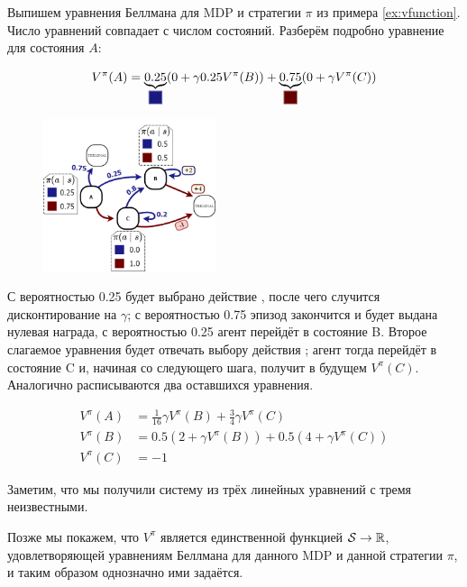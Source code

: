 \begin{example}
Выпишем уравнения Беллмана для MDP и стратегии $\pi$ из примера \ref{ex:vfunction}. Число уравнений совпадает с числом состояний. Разберём подробно уравнение для состояния $A$:

$$
V^{\pi}(A) = \underbrace{0.25}_{\colorsquare{ChadBlue}} (0 + \gamma 0.25 V^{\pi}(B)) + \underbrace{0.75}_{\colorsquare{ChadRed}} (0 + \gamma V^{\pi}(C) )
$$

\begin{figure}
\vspace{-0.8cm}
\centering
\includegraphics[width=0.45\textwidth]{Images/Value.png}
\vspace{-1cm}
\end{figure}

С вероятностью 0.25 будет выбрано действие , после чего случится дисконтирование на $\gamma$; с вероятностью 0.75 эпизод закончится и будет выдана нулевая награда, с вероятностью 0.25 агент перейдёт в состояние B. Второе слагаемое уравнения будет отвечать выбору действия ; агент тогда перейдёт в состояние C и, начиная со следующего шага, получит в будущем $V^{\pi}(C)$. Аналогично расписываются два оставшихся уравнения.

\vspace{-0.4cm}
\begin{align*}
V^{\pi}(A) &= \frac{1}{16} \gamma V^{\pi}(B) + \frac{3}{4} \gamma V^{\pi}(C) \\
V^{\pi}(B) &= 0.5 \left(2 + \gamma V^{\pi}(B) \right) + 0.5 \left( 4 + \gamma V^{\pi}(C) \right) \\
V^{\pi}(C) &= -1
\end{align*}

Заметим, что мы получили систему из трёх линейных уравнений с тремя неизвестными.
\end{example}

Позже мы покажем, что $V^\pi$ является единственной функцией $\St \HM\to \R$, удовлетворяющей уравнениям Беллмана для данного MDP и данной стратегии $\pi$, и таким образом однозначно ими задаётся.

